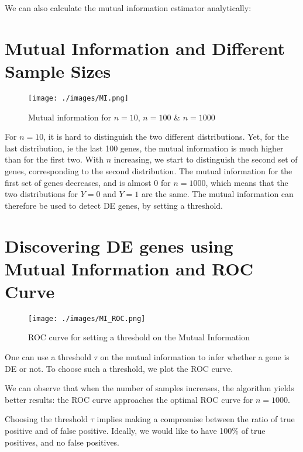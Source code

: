 \documentclass{article}
\begin{document}
We can also calculate the mutual information estimator analytically:


\section{Mutual Information and Different Sample Sizes}

\begin{figure}
\begin{center}
\texttt{[image: ./images/MI.png]}
\end{center}
\caption{Mutual information for $n=10$, $n=100$ \& $n=1000$}
\end{figure}

For $n = 10$, it is hard to distinguish the two different distributions. Yet,
for the last distribution, ie the last 100 genes, the mutual information is
much higher than for the first two. With $n$ increasing, we start to
distinguish the second set of genes, corresponding to the second distribution.
The mutual information for the first set of genes decreases, and is almost 0
for $n = 1000$, which means that the two distributions for $Y = 0$ and $Y = 1$
are the same.
The mutual information can therefore be used to detect DE genes, by setting a
threshold.


\section{Discovering DE genes using Mutual Information and ROC Curve}
\begin{figure}
\begin{center}
\texttt{[image: ./images/MI\_ROC.png]}
\end{center}
\caption{ROC curve for setting a threshold on the Mutual Information}
\end{figure}

One can use a threshold $\tau$ on the mutual information to infer whether a
gene is DE or not. To choose such a threshold, we plot the ROC curve.

We can observe that when the number of samples increases, the algorithm yields
better results: the ROC curve approaches the optimal ROC curve for $n = 1000$.

Choosing the threshold $\tau$ implies making a compromise between the ratio of
true positive and of false positive. Ideally, we would like to have 100\% of
true positives, and no false positives.
\end{document}
